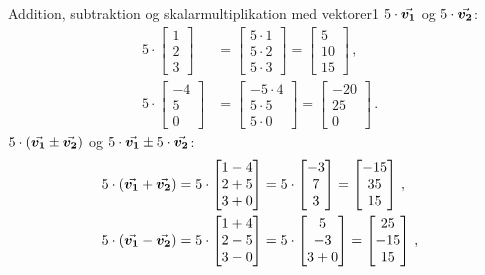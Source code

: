 \begin{opgave}{Addition, subtraktion og skalarmultiplikation med vektorer}{1}
	\opg $5\cdot{\vec{\boldsymbol{v_1}}}$ og $5\cdot{\vec{\boldsymbol{v_2}}}$:
	\begin{align*}
	5 \cdot \begin{bmatrix} 1 \\ 2 \\ 3 \end{bmatrix} &= \begin{bmatrix} 5\cdot 1 \\ 5\cdot 2 \\ 5\cdot 3 \end{bmatrix} = \begin{bmatrix} 5 \\ 10 \\ 15 \end{bmatrix} \, , \\
	5 \cdot \begin{bmatrix} -4 \\ 5 \\ 0 \end{bmatrix} &= \begin{bmatrix} -5\cdot 4 \\ 5\cdot 5 \\ 5\cdot 0 \end{bmatrix} = \begin{bmatrix} -20 \\ 25 \\ 0 \end{bmatrix} \, .
	\end{align*}
	\opg $5\cdot({\vec{\boldsymbol{v_1}}}\pm{\vec{\boldsymbol{v_2}}})$ og $5\cdot{\vec{\boldsymbol{v_1}}}\pm 5\cdot{\vec{\boldsymbol{v_2}}}$:
	\begin{align*}
	5\cdot(\v{v_1} + \v{v_2}) &= 5\cdot \begin{bmatrix} 1-4 \\ 2+5 \\ 3+0 \end{bmatrix} = 5 \cdot \begin{bmatrix} -3 \\ 7 \\ 3 \end{bmatrix} = \begin{bmatrix} -15 \\ 35 \\ 15 \end{bmatrix} \, , \\
	5\cdot(\v{v_1}-\v{v_2}) &= 5\cdot \begin{bmatrix} 1+4 \\ 2-5 \\ 3-0 \end{bmatrix} = 5 \cdot \begin{bmatrix} 5 \\ -3 \\ 3+0 \end{bmatrix} = \begin{bmatrix} 25 \\ -15 \\ 15 \end{bmatrix} \, , \\

\end{align*}
\end{opgave}
